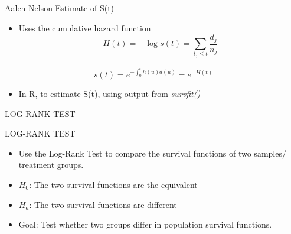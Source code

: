 \documentclass[ignorenonframetext,]{beamer}
\newenvironment{Shaded}{\begin{snugshade}}{\end{snugshade}}
\newcommand{\CommentTok}[1]{\textcolor[rgb]{0.56,0.35,0.01}{\textit{{#1}}}}
\begin{document}
\begin{frame}[fragile]{Aalen-Nelson Estimate of S(t)}

\begin{itemize}
\itemsep1pt\parskip0pt
\item
  Uses the cumulative hazard function \[
  H(t) = - \log s(t) = \sum_{t_j\leq t}\frac{d_j}{n_j}
  \]
\end{itemize}

\[
s(t)=e^{-\int_{0}^{t} h(u)d(u)} =e^{-H(t)}
\]

\begin{itemize}
\itemsep1pt\parskip0pt
\item
  In R, to estimate S(t), using output from \emph{survfit()}
\end{itemize}

\begin{Shaded}
\end{Shaded}

\end{frame}

\begin{frame}{LOG-RANK TEST}

\end{frame}

\begin{frame}{LOG-RANK TEST}

\begin{itemize}
\item
  Use the Log-Rank Test to compare the survival functions of two
  samples/ treatment groups.
\item
  \(H_0\): The two survival functions are the equivalent
\item
  \(H_a\): The two survival functions are different
\item
  Goal: Test whether two groups differ in population survival functions.
\end{itemize}

\end{frame}
\end{document}
